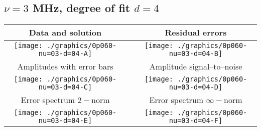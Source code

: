

% 

\clearpage{}
\break{}

\subsection{$\nu = 3$ MHz, degree of fit $d = 4$}

\begin{table}[h]
    \begin{center}
        \begin{tabular}{ccc}
            Data and solution & \quad & Residual errors \\\hline
            \texttt{[image: ./graphics/0p060-nu=03-d=04-A]} &&
            \texttt{[image: ./graphics/0p060-nu=03-d=04-B]} \\[15pt]
            Amplitudes with error bars && Amplitude signal--to--noise \\\hline
            \texttt{[image: ./graphics/0p060-nu=03-d=04-C]} &&
            \texttt{[image: ./graphics/0p060-nu=03-d=04-D]} \\[15pt]
            Error spectrum $2-$norm && Error spectrum $\infty-$norm \\\hline
            \texttt{[image: ./graphics/0p060-nu=03-d=04-E]} &&
            \texttt{[image: ./graphics/0p060-nu=03-d=04-F]} \\[15pt]
        \end{tabular}
    \end{center}
\label{fig:elev=60, nu=3}
\end{table}



\endinput
